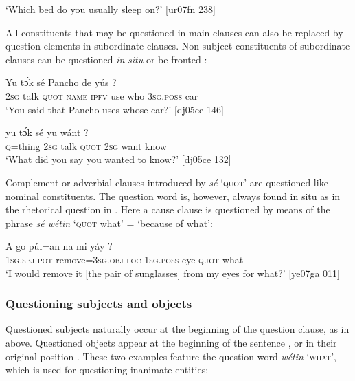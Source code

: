 \glt ‘Which bed do you usually sleep on?’ [ur07fn 238]
\z

All constituents that may be questioned in main clauses can also be replaced by question elements in subordinate clauses. Non-subject constituents of subordinate clauses can be questioned \textit{in} \textit{situ}  or be fronted : 


\ea%
    \label{ex:key:597}
    \gll Yu  tɔ́k  sé    Pancho  de  yús        ?\\
\textsc{2sg}  talk  \textsc{quot}    \textsc{name}  \textsc{ipfv}  use  who    \textsc{3sg.poss}  car\\

\glt ‘You said that Pancho uses whose car?’ [dj05ce 146]
\z


\ea%
    \label{ex:key:598}
    \gll {}  yu  tɔ́k  sé    yu  wánt  ?\\
\textsc{q}=thing  \textsc{2sg}  talk  \textsc{quot}    \textsc{2sg}  want  know\\

\glt ‘What did you say you wanted to know?’ [dj05ce 132]
\z

Complement or adverbial clauses introduced by \textit{sé} ‘\textsc{quot}’ are questioned like nominal constituents. The question word is, however, always found in situ as in the rhetorical question in . Here a cause clause is questioned by means of the phrase \textit{sé wétin} ‘\textsc{quot} what’ = ‘because of what’:


\ea%
    \label{ex:key:599}
    \gll A    go  púl=an      na  mi    yáy      ?\\
\textsc{1sg.sbj}  \textsc{pot}  remove=\textsc{3sg.obj}  \textsc{loc}  \textsc{1sg.poss}  eye  \textsc{quot}    what\\

\glt ‘I would remove it [the pair of sunglasses] from my eyes for what?’ [ye07ga 011]
\z

\subsubsection{Questioning subjects and objects}

Questioned subjects naturally occur at the beginning of the question clause, as in  above. Questioned objects appear at the beginning of the sentence , or in their original position . These two examples feature the question word \textit{wétin} ‘\textsc{what’}, which is used for questioning inanimate entities: 


